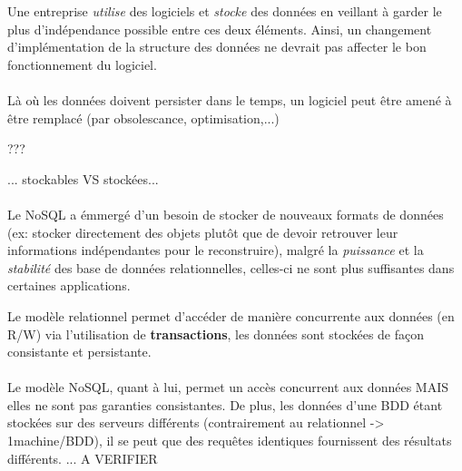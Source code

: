 \item{}
{\vrai}
{Une entreprise \textit{utilise} des logiciels et \textit{stocke} des données en veillant à garder le plus d'indépendance possible entre ces deux éléments. Ainsi, un changement d'implémentation de la structure des données ne devrait pas affecter le bon fonctionnement du logiciel.

\paragraph{}
Là où les données doivent persister dans le temps, un logiciel peut être amené à être remplacé (par obsolescance, optimisation,...)
}


\item{}
{\faux}
{}


\item{}
{???}
{}


\item{}
{\faux}
{... stockables VS stockées...

\paragraph{}
Le NoSQL a émmergé d'un besoin de stocker de nouveaux formats de données (ex: stocker directement des objets plutôt que de devoir retrouver leur informations indépendantes pour le reconstruire), malgré la \textit{puissance} et la \textit{stabilité} des base de données relationnelles, celles-ci ne sont plus suffisantes dans certaines applications.
}


\item{}
{\faux}
{Le modèle relationnel permet d'accéder de manière concurrente aux données (en R/W) via l'utilisation de \textbf{transactions}, les données sont stockées de façon consistante et persistante.

\paragraph{}
Le modèle NoSQL, quant à lui, permet un accès concurrent aux données MAIS elles ne sont pas garanties consistantes. De plus, les données d'une BDD étant stockées sur des serveurs différents (contrairement au relationnel -> 1machine/BDD), il se peut que des requêtes identiques fournissent des résultats différents. ... A VERIFIER
}


